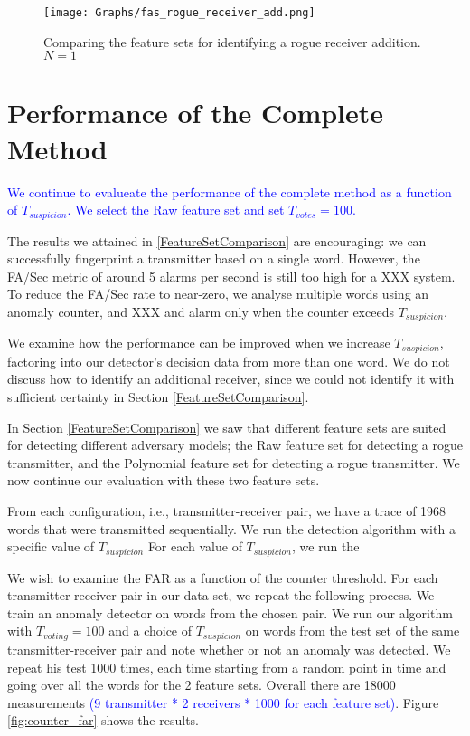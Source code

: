 \documentclass[compsoc,conference,a4paper]{IEEEtran}
\newcommand{\level}[1]{\section{#1}}
\newcommand{\level}[1]{\chapter{#1}}
\begin{document}
  \begin{figure}[t]
    \centering
    \texttt{[image: Graphs/fas\_rogue\_receiver\_add.png]}
    \caption{Comparing the feature sets for identifying a rogue receiver addition. \(N = 1\)}
    \label{fig:load_results}
  \end{figure}

\level{Performance of the Complete Method} \label{PerformanceEvaluationCompleteMethod}
  \textcolor{blue}{We continue to evalueate the performance of the complete method as a function of $T_{suspicion}$. We select the Raw feature set and set $T_{votes} = 100$.}
  
  The results we attained in \ref{FeatureSetComparison} are encouraging: we can successfully fingerprint a transmitter based on a single word. However, the FA/Sec metric of around 5 alarms per second is still too high for a XXX system. To reduce the FA/Sec rate to near-zero, we analyse multiple words using an anomaly counter, and XXX and alarm only when the counter exceeds $T_{suspicion}$.
  
  We examine how the performance can be improved when we increase $T_{suspicion}$, factoring into our detector's decision data from more than one word.  We do not discuss how to identify an additional receiver, since we could not identify it with sufficient certainty in Section \ref{FeatureSetComparison}.
  
  In Section \ref{FeatureSetComparison} we saw that different feature sets are suited for detecting different adversary models; the Raw feature set for detecting a rogue transmitter, and the Polynomial feature set for detecting a rogue transmitter. We now continue our evaluation with these two feature sets.
  
  From each configuration, i.e., transmitter-receiver pair, we have a trace of 1968 words that were transmitted sequentially. We run the detection algorithm with a specific value of $T_{suspicion}$
  For each value of $T_{suspicion}$, we run the 
  
  We wish to examine the FAR as a function of the counter threshold. For each transmitter-receiver pair in our data set, we repeat the following process. We train an anomaly detector on words from the chosen pair. We run our algorithm with $T_{voting} = 100$ and a choice of $T_{suspicion}$ on words from the test set of the same transmitter-receiver pair and note whether or not an anomaly was detected. We repeat his test 1000 times, each time starting from a random point in time and going over all the words for the 2 feature sets.  Overall there are 18000 measurements \textcolor{blue}{(9 transmitter * 2 receivers * 1000 for each feature set)}. Figure \ref{fig:counter_far} shows the results.
  
\end{document}
